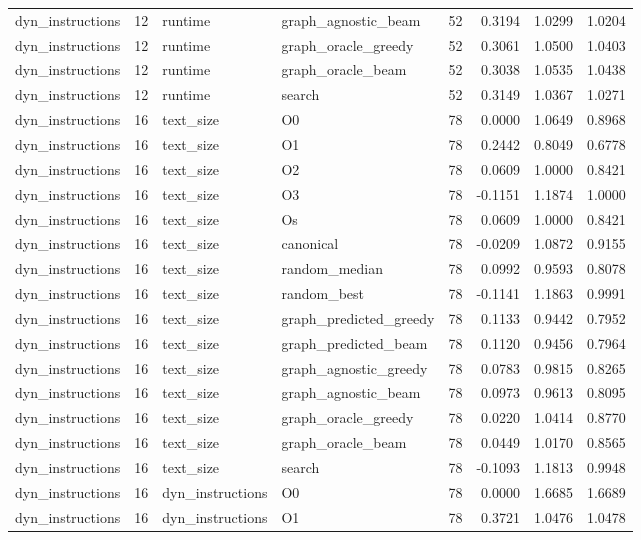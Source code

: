 \begin{table}[t]
\begin{tabular}{lrllrrrr}
dyn\_instructions & 12 & runtime & graph\_agnostic\_beam & 52 & 0.3194 & 1.0299 & 1.0204 \\
dyn\_instructions & 12 & runtime & graph\_oracle\_greedy & 52 & 0.3061 & 1.0500 & 1.0403 \\
dyn\_instructions & 12 & runtime & graph\_oracle\_beam & 52 & 0.3038 & 1.0535 & 1.0438 \\
dyn\_instructions & 12 & runtime & search & 52 & 0.3149 & 1.0367 & 1.0271 \\
dyn\_instructions & 16 & text\_size & O0 & 78 & 0.0000 & 1.0649 & 0.8968 \\
dyn\_instructions & 16 & text\_size & O1 & 78 & 0.2442 & 0.8049 & 0.6778 \\
dyn\_instructions & 16 & text\_size & O2 & 78 & 0.0609 & 1.0000 & 0.8421 \\
dyn\_instructions & 16 & text\_size & O3 & 78 & -0.1151 & 1.1874 & 1.0000 \\
dyn\_instructions & 16 & text\_size & Os & 78 & 0.0609 & 1.0000 & 0.8421 \\
dyn\_instructions & 16 & text\_size & canonical & 78 & -0.0209 & 1.0872 & 0.9155 \\
dyn\_instructions & 16 & text\_size & random\_median & 78 & 0.0992 & 0.9593 & 0.8078 \\
dyn\_instructions & 16 & text\_size & random\_best & 78 & -0.1141 & 1.1863 & 0.9991 \\
dyn\_instructions & 16 & text\_size & graph\_predicted\_greedy & 78 & 0.1133 & 0.9442 & 0.7952 \\
dyn\_instructions & 16 & text\_size & graph\_predicted\_beam & 78 & 0.1120 & 0.9456 & 0.7964 \\
dyn\_instructions & 16 & text\_size & graph\_agnostic\_greedy & 78 & 0.0783 & 0.9815 & 0.8265 \\
dyn\_instructions & 16 & text\_size & graph\_agnostic\_beam & 78 & 0.0973 & 0.9613 & 0.8095 \\
dyn\_instructions & 16 & text\_size & graph\_oracle\_greedy & 78 & 0.0220 & 1.0414 & 0.8770 \\
dyn\_instructions & 16 & text\_size & graph\_oracle\_beam & 78 & 0.0449 & 1.0170 & 0.8565 \\
dyn\_instructions & 16 & text\_size & search & 78 & -0.1093 & 1.1813 & 0.9948 \\
dyn\_instructions & 16 & dyn\_instructions & O0 & 78 & 0.0000 & 1.6685 & 1.6689 \\
dyn\_instructions & 16 & dyn\_instructions & O1 & 78 & 0.3721 & 1.0476 & 1.0478 \\

\end{tabular}
\end{table}
